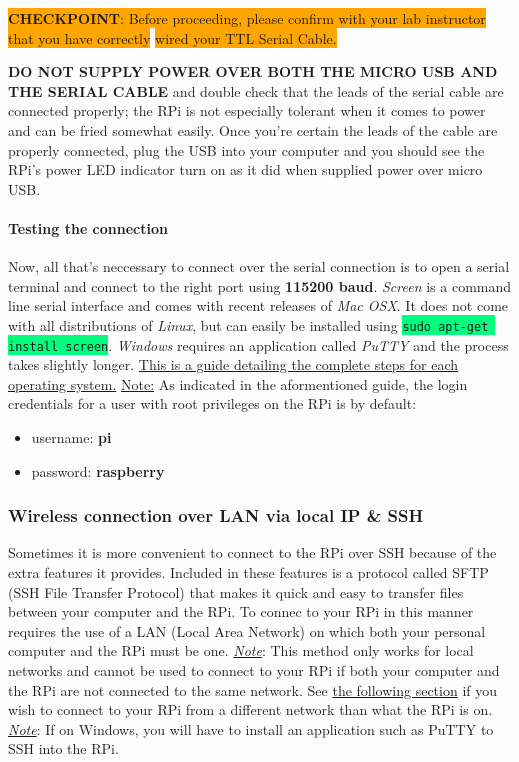 \documentclass{article}
\newcommand{\codei}[1]{\colorbox{SpringGreen}{\texttt{#1}}} %
\newcommand{\checkpoint}[2]{
    \newline \newline
    \noindent
    \colorbox{Orange}{\textbf{CHECKPOINT}: #1} \newline \colorbox{Orange}{#2}
    \newline \newline
}
\begin{document}
    \checkpoint{Before proceeding, please confirm with your lab instructor that you have correctly}{wired your TTL Serial Cable.}

    \textbf{DO NOT SUPPLY POWER OVER BOTH THE MICRO USB AND THE SERIAL CABLE} and double check that the leads of the serial cable are connected properly; the RPi is not especially tolerant when it comes to power and can be fried somewhat easily. Once you're certain the leads of the cable are properly connected, plug the USB into your computer and you should see the RPi's power LED indicator turn on as it did when supplied power over micro USB.

    \paragraph{Testing the connection}
    Now, all that's neccessary to connect over the serial connection is to open a serial terminal and connect to the right port using \textbf{115200 baud}. \textit{Screen} is a command line serial interface and comes with recent releases of \textit{Mac OSX}. It does not come with all distributions of \textit{Linux}, but can easily be installed using \codei{sudo apt-get install screen}. \textit{Windows} requires an application called \textit{PuTTY} and the process takes slightly longer. \href{https://learn.adafruit.com/adafruits-raspberry-pi-lesson-5-using-a-console-cable/test-and-configure}{This is a guide detailing the complete steps for each operating system.}
    \newline\newline
    \underline{Note:} As indicated in the aformentioned guide, the login credentials for a user with root privileges on the RPi is by default:
    \begin{itemize}
      \item username: \textbf{pi}
      \item password: \textbf{raspberry}
    \end{itemize}
    \subsubsection{Wireless connection over LAN via local IP \& SSH}
    \label{sec:connect-ssh}
    Sometimes it is more convenient to connect to the RPi over SSH because of the extra features it provides. Included in these features is a protocol called SFTP (SSH File Transfer Protocol) that makes it quick and easy to transfer files between your computer and the RPi. To connec to your RPi in this manner requires the use of a LAN (Local Area Network) on which both your personal computer and the RPi must be one.
    \newline
    \newline
    \underline{\textit{Note}}: This method only works for local networks and cannot be used to connect to your RPi if both your computer and the RPi are not connected to the same network. See \hyperref[sec:connect-sshwan]{the following section} if you wish to connect to your RPi from a different network than what the RPi is on.
    \underline{\textit{Note}}: If on Windows, you will have to install an application such as PuTTY to SSH into the RPi.
\end{document}
